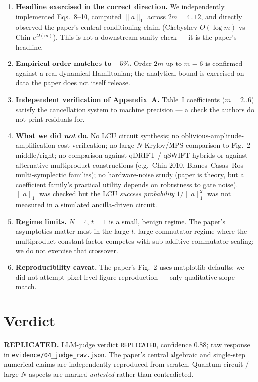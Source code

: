\documentclass[11pt]{article}
\begin{document}
\begin{enumerate}
  \item \textbf{Headline exercised in the correct direction.} We independently implemented Eqs.~8--10, computed $\|a\|_1$ across $2m=4..12$, and directly observed the paper's central conditioning claim (Chebyshev $O(\log m)$ vs Chin $e^{\Omega(m)}$). This is not a downstream sanity check --- it is the paper's headline.
  \item \textbf{Empirical order matches to $\pm 5\%$.} Order $2m$ up to $m=6$ is confirmed against a real dynamical Hamiltonian; the analytical bound is exercised on data the paper does not itself release.
  \item \textbf{Independent verification of Appendix~A.} Table~I coefficients ($m=2..6$) satisfy the cancellation system to machine precision --- a check the authors do not print residuals for.
  \item \textbf{What we did \emph{not} do.} No LCU circuit synthesis; no oblivious-amplitude-amplification cost verification; no large-$N$ Krylov/MPS comparison to Fig.~2 middle/right; no comparison against qDRIFT / qSWIFT hybrids or against alternative multiproduct constructions (e.g.\ Chin 2010, Blanes--Casas--Ros multi-symplectic families); no hardware-noise study (paper is theory, but a coefficient family's practical utility depends on robustness to gate noise). $\|a\|_1$ was checked but the LCU \emph{success probability} $1/\|a\|_1^2$ was not measured in a simulated ancilla-driven circuit.
  \item \textbf{Regime limits.} $N=4$, $t=1$ is a small, benign regime. The paper's asymptotics matter most in the large-$t$, large-commutator regime where the multiproduct constant factor competes with sub-additive commutator scaling; we do not exercise that crossover.
  \item \textbf{Reproducibility caveat.} The paper's Fig.~2 uses matplotlib defaults; we did not attempt pixel-level figure reproduction --- only qualitative slope match.
\end{enumerate}

\section{Verdict}
\textbf{REPLICATED.} LLM-judge verdict \texttt{REPLICATED}, confidence 0.88; raw response in \texttt{evidence/04\_judge\_raw.json}. The paper's central algebraic and single-step numerical claims are independently reproduced from scratch. Quantum-circuit / large-$N$ aspects are marked \emph{untested} rather than contradicted.


\end{document}
